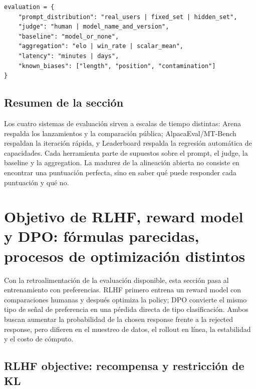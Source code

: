 \documentclass[a4paper]{article}
\begin{document}

\begin{lstlisting}[caption={Estructura mínima de registro de un portfolio de evaluación}]
evaluation = {
    "prompt_distribution": "real_users | fixed_set | hidden_set",
    "judge": "human | model_name_and_version",
    "baseline": "model_or_none",
    "aggregation": "elo | win_rate | scalar_mean",
    "latency": "minutes | days",
    "known_biases": ["length", "position", "contamination"]
}
\end{lstlisting}

\subsection{Resumen de la sección}

Los cuatro sistemas de evaluación sirven a escalas de tiempo distintas: Arena respalda los lanzamientos y la comparación pública; AlpacaEval/MT-Bench respaldan la iteración rápida, y Leaderboard respalda la regresión automática de capacidades. Cada herramienta parte de supuestos sobre el prompt, el judge, la baseline y la aggregation. La madurez de la alineación abierta no consiste en encontrar una puntuación perfecta, sino en saber qué puede responder cada puntuación y qué no.
\section{Objetivo de RLHF, reward model y DPO: fórmulas parecidas, procesos de optimización distintos}

Con la retroalimentación de la evaluación disponible, esta sección pasa al entrenamiento con preferencias. RLHF primero entrena un reward model con comparaciones humanas y después optimiza la policy; DPO convierte el mismo tipo de señal de preferencia en una pérdida directa de tipo clasificación. Ambos buscan aumentar la probabilidad de la chosen response frente a la rejected response, pero difieren en el muestreo de datos, el rollout en línea, la estabilidad y el costo de cómputo.

\subsection{RLHF objective: recompensa y restricción de KL}
\end{document}
